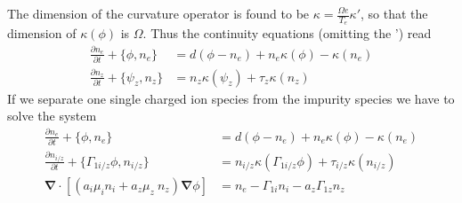 \documentclass[a4paper,12pt]{scrartcl}
\renewcommand{\vec}[1]{{\mathbf{#1}}}
\begin{document}
The dimension of the curvature operator is found to be
$\kappa = \frac{\Omega e}{T_e}\kappa'$, 
so that the dimension of $\kappa(\phi)$ is $\Omega$.
Thus the continuity equations (omitting the ') read
\begin{subequations}
\begin{align}
    \frac{\partial n_e}{\partial t} + \{\phi, n_e\} &= d( \phi - n_e) + n_e\kappa(\phi) -
    \kappa(n_e) \\
    \frac{\partial n_z}{\partial t} + \{\psi_z, n_z\} &= n_z\kappa(\psi_z) +
    \tau_z\kappa(n_z) 
    \label{}
\end{align}
\end{subequations}
If we separate one single charged ion species from the impurity species we 
have to solve the system
\begin{subequations}
    \begin{align}
    \frac{\partial n_e}{\partial t} + \{\phi, n_e\} &= d( \phi - n_e) + n_e\kappa(\phi) -
    \kappa(n_e) \\
    \frac{\partial n_{i/z}}{\partial t} + \{\Gamma_{1i/z}\phi, n_{i/z}\} &= 
    n_{i/z}\kappa(\Gamma_{1i/z}\phi) + \tau_{i/z}\kappa(n_{i/z}) \\
    \vec \nabla\cdot\left[ (a_i \mu_i n_i + a_z \mu_z\ n_z)\vec \nabla \phi \right] &= 
        n_e - \Gamma_{1i}n_i - a_z \Gamma_{1z} n_z
        \label{}
    \end{align}
    \label{}
\end{subequations}
\end{document}
